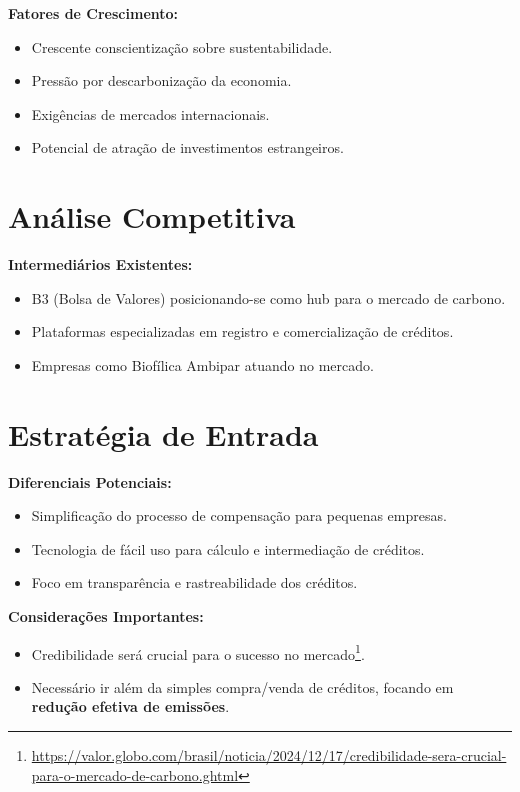 \documentclass[a4paper,12pt]{article}
\begin{document}
\textbf{Fatores de Crescimento:}
\begin{itemize}
    \item Crescente conscientização sobre sustentabilidade.
    \item Pressão por descarbonização da economia.
    \item Exigências de mercados internacionais.
    \item Potencial de atração de investimentos estrangeiros.
\end{itemize}

\section{Análise Competitiva}

\textbf{Intermediários Existentes:}
\begin{itemize}
    \item B3 (Bolsa de Valores) posicionando-se como hub para o mercado de carbono.
    \item Plataformas especializadas em registro e comercialização de créditos.
    \item Empresas como Biofílica Ambipar atuando no mercado.
\end{itemize}

\section{Estratégia de Entrada}

\textbf{Diferenciais Potenciais:}
\begin{itemize}
    \item Simplificação do processo de compensação para pequenas empresas.
    \item Tecnologia de fácil uso para cálculo e intermediação de créditos.
    \item Foco em transparência e rastreabilidade dos créditos.
\end{itemize}

\textbf{Considerações Importantes:}
\begin{itemize}
    \item Credibilidade será crucial para o sucesso no mercado\footnote{\url{https://valor.globo.com/brasil/noticia/2024/12/17/credibilidade-sera-crucial-para-o-mercado-de-carbono.ghtml}}.
    \item Necessário ir além da simples compra/venda de créditos, focando em \textbf{redução efetiva de emissões}.
\end{itemize}
\end{document}
